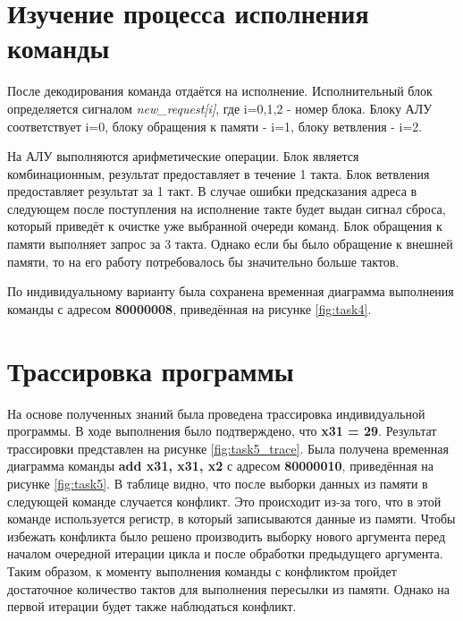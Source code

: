 \documentclass[a4paper, 14pt]{article}
\begin{document}
    \section{Изучение процесса исполнения команды}
    После декодирования команда отдаётся на исполнение. Исполнительный блок определяется сигналом \textit{new\_request[i]}, где i=0,1,2 - номер блока.
    Блоку АЛУ соответствует i=0, блоку обращения к памяти - i=1, блоку ветвления - i=2. 
    
    На АЛУ выполняются арифметические операции. Блок является комбинационным, результат предоставляет в течение 1 такта.
    Блок ветвления предоставляет результат за 1 такт. В случае ошибки предсказания адреса в следующем после поступления на исполнение такте будет выдан сигнал сброса, который приведёт к очистке уже выбранной очереди команд.
    Блок обращения к памяти выполняет запрос за 3 такта. Однако если бы было обращение к внешней памяти, то на его работу потребовалось бы значительно больше тактов.
    
    По индивидуальному варианту была сохранена временная диаграмма выполнения команды с адресом \textbf{80000008}, приведённая на рисунке \ref{fig:task4}.


    \section{Трассировка программы}
    На основе полученных знаний была проведена трассировка индивидуальной программы. В ходе выполнения было подтверждено, что \textbf{x31 = 29}.
    Результат трассировки представлен на рисунке \ref{fig:task5_trace}.
    Была получена временная диаграмма команды \textbf{add x31, x31, x2} с адресом \textbf{80000010}, приведённая на рисунке \ref{fig:task5}.
    В таблице видно, что после выборки данных из памяти в следующей команде случается конфликт.
    Это происходит из-за того, что в этой команде используется регистр, в который записываются данные из памяти.
    Чтобы избежать конфликта было решено производить выборку нового аргумента перед началом очередной итерации цикла и после обработки предыдущего аргумента. Таким образом, к моменту выполнения команды с конфликтом 
    пройдет достаточное количество тактов для выполнения пересылки из памяти. Однако на первой итерации будет также наблюдаться конфликт.
\end{document}

